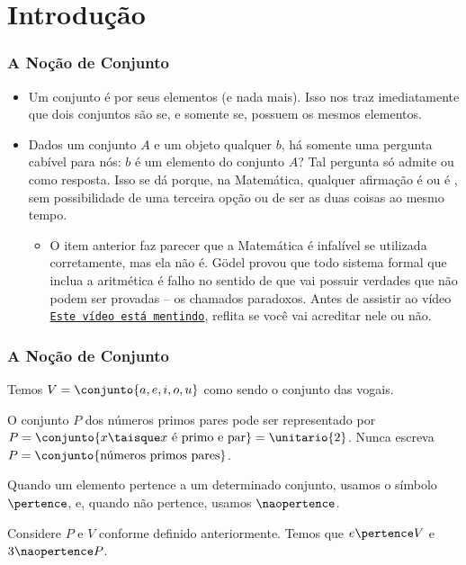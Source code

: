 \section{Introdução}


\begin{frame}
    \frametitle{A Noção de Conjunto}
    
    \begin{itemize}
        \item<1->
        Um conjunto é  por seus elementos (e nada mais). Isso nos traz imediatamente que dois conjuntos são  se, e somente se, possuem os mesmos elementos.

        \item<2->
        Dados um conjunto $A$ e um objeto qualquer $b$, há somente uma pergunta cabível para nós: $b$ é um elemento do conjunto $A$? Tal pergunta só admite  ou  como resposta. Isso se dá porque, na Matemática, qualquer afirmação é  ou é , sem possibilidade de uma terceira opção ou de ser as duas coisas ao mesmo tempo.
        \begin{itemize}
            \item<3-> O item anterior faz parecer que a Matemática é infalível se utilizada corretamente, mas ela não é. Gödel provou que todo sistema formal que inclua a aritmética é falho no sentido de que vai possuir verdades que não podem ser provadas -- os chamados paradoxos.  Antes de assistir ao vídeo \href{https://youtu.be/UI1xR_AECrU}{{\tt Este vídeo está mentindo}}, reflita se você vai acreditar nele ou não.
        \end{itemize}
    \end{itemize}
\end{frame}


\begin{frame}
    \frametitle{A Noção de Conjunto}

    \begin{exemplo}
        Temos $V = \conjunto {a, e, i, o, u}$ como sendo o conjunto das vogais.
    \end{exemplo}

    \begin{exemplo}
        O conjunto $P$ dos números primos pares pode ser representado por $P = \conjunto { x \taisque x \text{ é primo e par}} = \unitario{2}$. Nunca escreva $P = \conjunto{\text{números primos pares}}$.
    \end{exemplo}
    
    Quando um elemento pertence a um determinado conjunto, usamos o símbolo $\pertence$, e, quando não pertence, usamos $\naopertence$.
	
    \begin{exemplo}
        Considere $P$ e $V$ conforme definido anteriormente. Temos que $e \pertence V$ e $3 \naopertence P$.
    \end{exemplo}
\end{frame}


